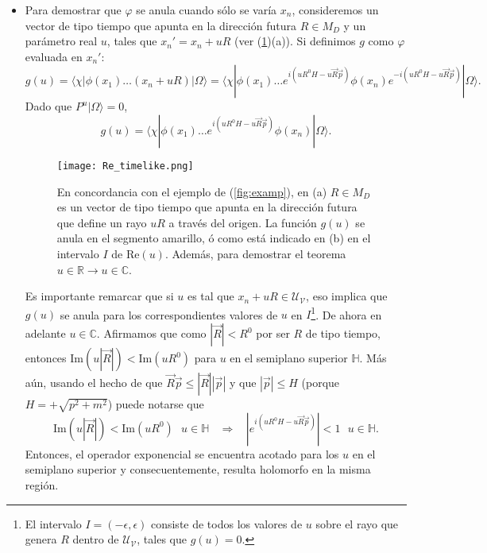 \begin{itemize}
\item Para demostrar que $\varphi$ se anula cuando sólo se varía $x_n$, consideremos un vector de tipo tiempo que apunta en la dirección futura $R\in M_D$ y un parámetro real $u$, tales que $x_n'=x_n+uR$ (ver (\ref{fig:Raxis})(a)). Si definimos $g$ como
$\varphi$ evaluada en $x_n'$:
\begin{equation}
g(u)=\langle\chi|\phi(x_1)\ldots(x_n+uR)|\Omega\rangle=\langle\chi|\phi(x_1)\ldots e^{i(uR^0H-u\vec{R}\vec{p})}\phi(x_n)e^{-i(uR^0H-u\vec{R}\vec{p})}|\Omega\rangle.
\end{equation}
Dado que $P^u|\Omega\rangle=0$,
\begin{equation}
g(u)=\langle\chi|\phi(x_1)\ldots e^{i(uR^0H-u\vec{R}\vec{p})}\phi(x_n)|\Omega\rangle.
\end{equation}
\begin{figure}[ht]
    \centering
    \texttt{[image: Re\_timelike.png]}
    \caption{En concordancia con el ejemplo de (\ref{fig:examp}), en (a) $R\in M_D$ es un vector de tipo tiempo que apunta en la dirección futura que define un rayo $uR$ a través del origen. La función $g(u)$ se anula en el segmento amarillo, ó como está indicado en (b) en el intervalo $I$ de $\text{Re}(u)$. Además, para demostrar el teorema $u\in \mathbb{R}\rightarrow u \in \mathbb{C}$.}
    \label{fig:Raxis}
 \end{figure}
Es importante remarcar que si $u$ es tal que $x_n+uR\in \mathcal{U}_{\mathcal{V}}$, eso implica que $g(u)$ se anula para los correspondientes valores de $u$ en $I$\footnote{El intervalo $I=(-\epsilon,\epsilon)$ consiste de todos los valores de $u$ sobre el rayo que genera $R$ dentro de $\mathcal{U}_{\mathcal{V}}$, tales que $g(u)=0$.}. De ahora en adelante $u\in \mathbb{C}$. Afirmamos que como $|\vec{R}|<R^0$ por ser $R$ de tipo tiempo, entonces $\text{Im}(u|\vec{R}|)<\text{Im}(uR^0)$ para $u$ en el semiplano superior $\mathbb{H}$. Más aún, usando el hecho de que $\vec{R}\vec{p}\leq |\vec{R}||\vec{p}|$ y que $|\vec{p}|\leq H$ (porque $H=+\sqrt{p^2+m^2}$) puede notarse que
\begin{equation}
\text{Im}(u|\vec{R}|)<\text{Im}(uR^0)\:\:\: u\in \mathbb{H} \:\:\:\:\Rightarrow \:\:\:\: \left|e^{i(uR^0H-u\vec{R}\vec{p})}\right|<1\:\:\: u\in \mathbb{H}.
\label{eq:bound}
\end{equation}
Entonces, el operador exponencial se encuentra acotado para los $u$ en el semiplano superior y consecuentemente, resulta holomorfo en la misma región.

\end{itemize}
